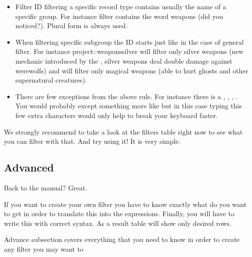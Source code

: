 \begin{itemize}
 \item Filter ID filtering a specific record type contains usually the name of a specific group. For instance  filter
 contains the word weapons (did you noticed?). Plural form is always used.
 \item When filtering specific subgroup the ID starts just like in the case of general filter. For instance project::weaponssilver will
 filter only silver weapons (new mechanic introduced by the \BM{}, silver weapons deal double damage against werewolfs) and 
  will filter only magical weapons (able to hurt ghosts and other supernatural creatures).
 \item There are few exceptions from the above rule. For instance there is a , ,
       , .
 You would probably except something more like  but in this case typing this few extra characters would only
 help to break your keyboard faster.
\end{itemize}

We strongly recommend to take a look at the filters table right now to see what you can filter with that. And try using it! It is very simple.

\subsection{Advanced}
Back to the manual? Great.

If you want to create your own filter you have to know exactly what do you want to get in order to translate this into the expressions.
Finally, you will have to write this with correct syntax. As a result table will show only desired rows.

Advance subsection covers everything that you need to know in order to create any filter you may want to %
